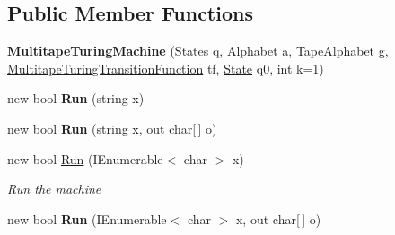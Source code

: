 \subsection*{Public Member Functions}
\begin{DoxyCompactItemize}
\item 
\mbox{\label{class_system_1_1_automata_1_1_multitape_turing_machine_afc461c5047fd4f27545eceae4110791f}} 
{\bfseries Multitape\+Turing\+Machine} (\mbox{\hyperlink{class_system_1_1_automata_1_1_states}{States}} q, \mbox{\hyperlink{class_system_1_1_automata_1_1_alphabet}{Alphabet}} a, \mbox{\hyperlink{class_system_1_1_automata_1_1_tape_alphabet}{Tape\+Alphabet}} g, \mbox{\hyperlink{class_system_1_1_automata_1_1_multitape_turing_transition_function}{Multitape\+Turing\+Transition\+Function}} tf, \mbox{\hyperlink{class_system_1_1_automata_1_1_state}{State}} q0, int k=1)
\item 
\mbox{\label{class_system_1_1_automata_1_1_multitape_turing_machine_a39f81dc6eaad76473b0771a75f6cd82c}} 
new bool {\bfseries Run} (string x)
\item 
\mbox{\label{class_system_1_1_automata_1_1_multitape_turing_machine_a426056ee2d8989e27ae31667ec6dfc40}} 
new bool {\bfseries Run} (string x, out char\mbox{[}$\,$\mbox{]} o)
\item 
new bool \mbox{\hyperlink{class_system_1_1_automata_1_1_multitape_turing_machine_abc213e915db06cf43250f4739ade5779}{Run}} (I\+Enumerable$<$ char $>$ x)
\begin{DoxyCompactList}\small\item\em Run the machine \end{DoxyCompactList}\item 
\mbox{\label{class_system_1_1_automata_1_1_multitape_turing_machine_a0d62cbc26d821e1200eecd1160eeaecd}} 
new bool {\bfseries Run} (I\+Enumerable$<$ char $>$ x, out char\mbox{[}$\,$\mbox{]} o)
\end{DoxyCompactItemize}
